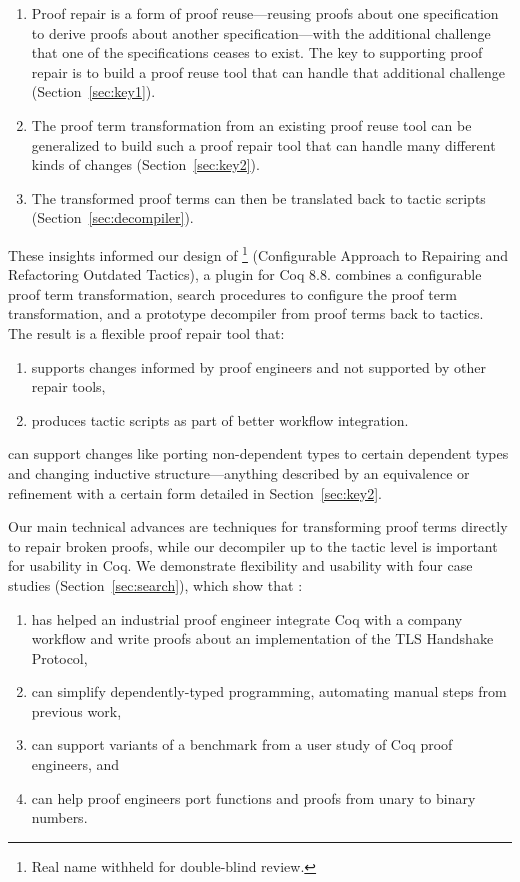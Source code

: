 \begin{enumerate}
\item Proof repair is a form of proof reuse---reusing proofs about one specification to derive proofs about another specification---with 
the additional challenge that one of the specifications ceases to exist.
The key to supporting proof repair is to build a proof reuse
tool that can handle that additional challenge (Section~\ref{sec:key1}). 
\item The proof term transformation from an existing proof reuse tool can be generalized
to build such a proof repair tool that can handle many different kinds of changes (Section~\ref{sec:key2}).
\item The transformed proof terms can then be translated back to tactic scripts (Section~\ref{sec:decompiler}).
\end{enumerate}

These insights informed our design of 
\toolname\footnote{Real name withheld for double-blind review.} (Configurable Approach to Repairing and Refactoring Outdated Tactics), a plugin for Coq 8.8.
\toolname combines a configurable proof term transformation,
search procedures to configure the proof term transformation,
and a prototype decompiler from proof terms back to tactics.
The result is a flexible proof repair tool that: 

\begin{enumerate}
\item supports changes informed by proof engineers and not supported by other repair tools,
\item produces tactic scripts as part of better workflow integration.
\end{enumerate}
\toolname can support changes like porting non-dependent types to certain dependent types
and changing inductive structure---anything described by an equivalence or refinement with a certain form
detailed in Section~\ref{sec:key2}.

Our main technical advances are techniques for transforming proof terms directly to repair broken proofs, while our decompiler up to the tactic level is important for usability in Coq.
We demonstrate flexibility and usability with four case studies (Section~\ref{sec:search}), which show that \toolname:

\begin{enumerate}
\item has helped an industrial proof engineer integrate Coq with a company workflow and write proofs about an implementation of the TLS Handshake Protocol,
\item can simplify dependently-typed programming, automating manual steps from previous work,
\item can support variants of a benchmark from a user study of Coq proof engineers, and
\item can help proof engineers port functions and proofs from unary to binary numbers.
\end{enumerate}

